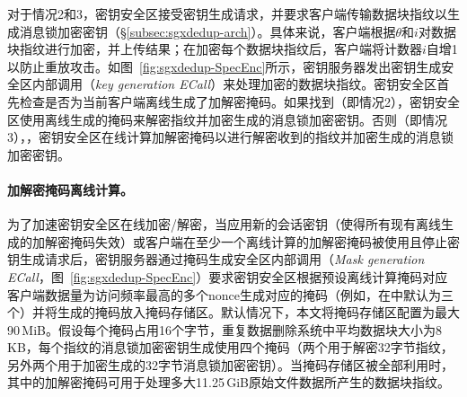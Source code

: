 对于情况2和3，密钥安全区接受密钥生成请求，并要求客户端传输数据块指纹以生成消息锁加密密钥（\S\ref{subsec:sgxdedup-arch}）。具体来说，客户端根据$\theta$和$i$对数据块指纹进行加密，并上​​传结果；在加密每个数据块指纹后，客户端将计数器$i$自增1以防止重放攻击。如图~\ref{fig:sgxdedup-SpecEnc}所示，密钥服务器发出密钥生成安全区内部调用（\textit{key generation ECall}）来处理加密的数据块指纹。密钥安全区首先检查是否为当前客户端离线生成了加解密掩码。如果找到（即情况2），密钥安全区使用离线生成的掩码来解密指纹并加密生成的消息锁加密密钥。否则（即情况3），，密钥安全区在线计算加解密掩码以进行解密收到的指纹并加密生成的消息锁加密密钥。

\paragraph*{加解密掩码离线计算。}为了加速密钥安全区在线加密/解密，当应用新的会话密钥（使得所有现有离线生成的加解密掩码失效）或客户端在至少一个离线计算的加解密掩码被使用且停止密钥生成请求后，密钥服务器通过掩码生成安全区内部调用（\textit{Mask generation ECall}，图~\ref{fig:sgxdedup-SpecEnc}）要求密钥安全区根据预设离线计算掩码对应客户端数据量为访问频率最高的多个nonce生成对应的掩码（例如，在\sysnameS 中默认为三个）并将生成的掩码放入掩码存储区。默认情况下，本文将掩码存储区配置为最大 90\,MiB。假设每个掩码占用16个字节，重复数据删除系统中平均数据块大小为8\,KB，每个指纹的消息锁加密密钥生成使用四个掩码（两个用于解密32字节指纹，另外两个用于加密生成的32字节消息锁加密密钥）。当掩码存储区被全部利用时，其中的加解密掩码可用于处理多大11.25\,GiB原始文件数据所产生的数据块指纹。
